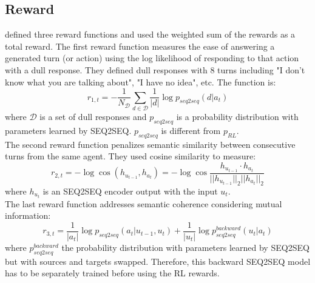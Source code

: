 \documentclass[letterpaper]{article}
\begin{document}
\subsection{Reward}
\cite{Li} defined three reward functions and used the weighted sum of the rewards as a total reward. The first reward function measures the ease of answering a generated turn (or action) using the log likelihood of responding to that action with a dull response. They defined dull responses with 8 turns including "I don't know what you are talking about", "I have no idea", etc. The function is:
\begin{equation}
	r_{1,t} = -\frac{1}{N_{\mathcal{D}}} \sum_{d\in \mathcal{D}} \frac{1}{|d|} \log p_{seq2seq}(d|a_t)
\end{equation} 
where $\mathcal{D}$ is a set of dull responses and $p_{seq2seq}$ is a probability distribution with parameters learned by SEQ2SEQ. $p_{seq2seq}$ is different from $p_{RL}$. \\
The second reward function penalizes semantic similarity between consecutive turns from the same agent. They used cosine similarity to measure:
\begin{equation}
	r_{2,t} = -\log \cos (h_{u_{t-1}}, h_{a_t}) = -\log \cos \frac{h_{u_{t-1}}\cdot h_{a_t}}{||h_{u_{t-1}}||_2 ||h_{a_t}||_2} \label{eq:reward2}
\end{equation}
where $h_{u_{t}}$ is an SEQ2SEQ encoder output with the input $u_t$. \\
The last reward function addresses semantic coherence considering mutual information:
\begin{equation}
r_{3,t} = \frac{1}{|a_t|} \log p_{seq2seq} (a_t|u_{t-1},u_t) + \frac{1}{|u_t|} \log p_{seq2seq}^{backward}(u_t|a_t) \label{eq:reward3}
\end{equation}
where $ p_{seq2seq}^{backward}$ the probability distribution with parameters learned by SEQ2SEQ but with sources and targets swapped. Therefore, this backward SEQ2SEQ model has to be separately trained before using the RL rewards. 
\end{document}
